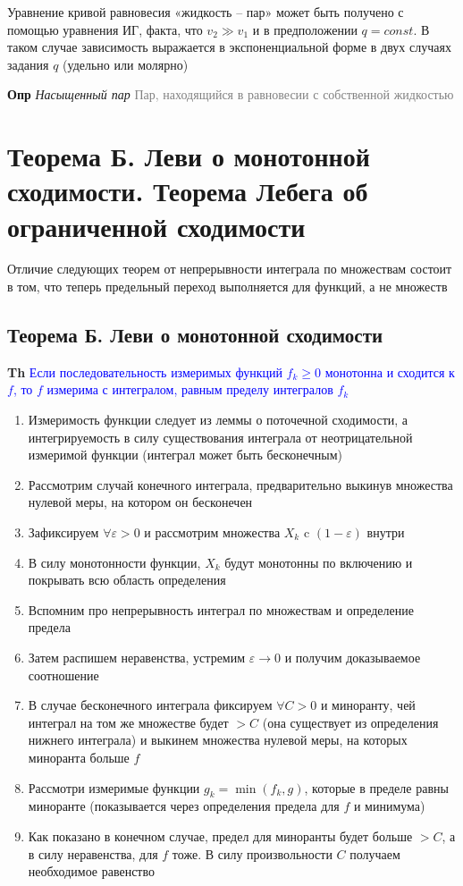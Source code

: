 \documentclass[a4paper, 14pt]{article}
\begin{document}
    Уравнение кривой равновесия «жидкость -- пар» может быть получено с помощью уравнения ИГ, факта, что $v_2 \gg
    v_1$ и в предположении $q = const$.
    В таком случае зависимость выражается в экспоненциальной форме в двух случаях задания $q$ (удельно или молярно)

    \textbf{Опр} \textit{Насыщенный пар} \textcolor{gray}{Пар, находящийся в равновесии с собственной жидкостью}

    \section{Теорема Б. Леви о монотонной сходимости.
    Теорема Лебега об ограниченной сходимости}

    Отличие следующих теорем от непрерывности интеграла по множествам состоит в том, что теперь предельный переход
    выполняется для функций, а не множеств

    \subsection{Теорема Б. Леви о монотонной сходимости}

    \textbf{Th} \textcolor{blue}{Если последовательность измеримых функций $f_k \geq 0$ монотонна и сходится к $f$,
        то $f$ измерима с интегралом, равным пределу интегралов $f_k$}

    \begin{enumerate}
        \item Измеримость функции следует из леммы о поточечной сходимости, а интегрируемость в силу
        существования интеграла от неотрицательной измеримой функции (интеграл может быть бесконечным)
        \item Рассмотрим случай конечного интеграла, предварительно выкинув множества нулевой меры, на котором он
        бесконечен
        \item Зафиксируем $\forall \varepsilon > 0$ и рассмотрим множества $X_k$ c $(1 - \varepsilon)$ внутри
        \item В силу монотонности функции, $X_k$ будут монотонны по включению и покрывать всю область определения
        \item Вспомним про непрерывность интеграл по множествам и определение предела
        \item Затем распишем неравенства, устремим $\varepsilon \rightarrow 0$ и получим доказываемое соотношение
        \item В случае бесконечного интеграла фиксируем $\forall C > 0$ и миноранту, чей интеграл на том же множестве
        будет $> C$ (она существует из определения нижнего интеграла) и выкинем множества нулевой меры, на
        которых миноранта больше $f$
        \item Рассмотри измеримые функции $g_k = \min(f_k, g)$, которые в пределе равны миноранте (показывается через
        определения предела для $f$ и минимума)
        \item Как показано в конечном случае, предел для миноранты будет больше $> C$, а в силу неравенства, для $f$
        тоже.
        В силу произвольности $C$ получаем необходимое равенство
    \end{enumerate}
\end{document}
